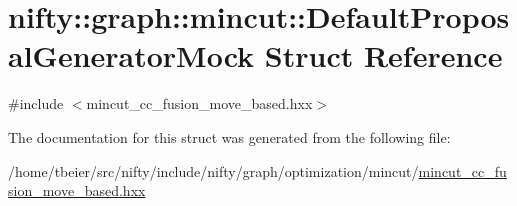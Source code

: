 \hypertarget{structnifty_1_1graph_1_1mincut_1_1DefaultProposalGeneratorMock}{}\section{nifty\+:\+:graph\+:\+:mincut\+:\+:Default\+Proposal\+Generator\+Mock Struct Reference}
\label{structnifty_1_1graph_1_1mincut_1_1DefaultProposalGeneratorMock}


{\ttfamily \#include $<$mincut\+\_\+cc\+\_\+fusion\+\_\+move\+\_\+based.\+hxx$>$}



The documentation for this struct was generated from the following file\+:\begin{DoxyCompactItemize}
\item 
/home/tbeier/src/nifty/include/nifty/graph/optimization/mincut/\hyperlink{mincut__cc__fusion__move__based_8hxx}{mincut\+\_\+cc\+\_\+fusion\+\_\+move\+\_\+based.\+hxx}\end{DoxyCompactItemize}
